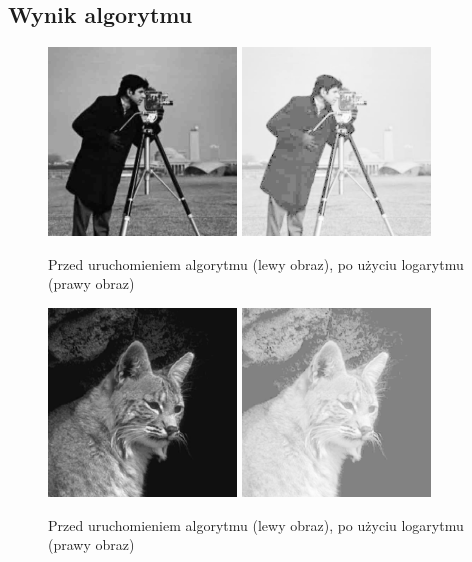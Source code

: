 \documentclass[a4paper,12pt]{book}
\begin{document}
\subsection*{Wynik algorytmu}
\begin{figure}[H]
	\caption{Przed uruchomieniem algorytmu (lewy obraz), po użyciu logarytmu (prawy obraz)}
	\includegraphics[width=5cm, height=5cm]{man-unmodified.jpg}
	\includegraphics[width=5cm, height=5cm]{2-7/logarithm-gray-photoman.png}
\end{figure}
\begin{figure}[H]
	\caption{Przed uruchomieniem algorytmu (lewy obraz), po użyciu logarytmu (prawy obraz)}
	\includegraphics[width=5cm, height=5cm]{cat-unmodified.jpg}
	\includegraphics[width=5cm, height=5cm]{2-7/logarithm-gray-cat.png}
\end{figure}
\end{document}
